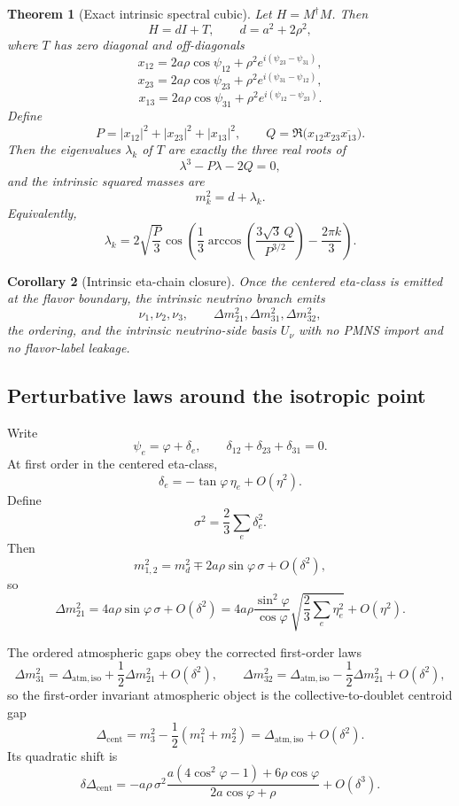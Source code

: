 \documentclass[11pt]{article}
\newtheorem{theorem}{Theorem}[section]
\newtheorem{corollary}[theorem]{Corollary}
\begin{document}
\begin{theorem}[Exact intrinsic spectral cubic]
Let \(H=M^\dagger M\). Then
\[
H=dI+T,
\qquad
d=a^2+2\rho^2,
\]
where \(T\) has zero diagonal and off-diagonals
\[
x_{12}=2a\rho\cos\psi_{12}+\rho^2e^{i(\psi_{23}-\psi_{31})},
\]
\[
x_{23}=2a\rho\cos\psi_{23}+\rho^2e^{i(\psi_{31}-\psi_{12})},
\]
\[
x_{13}=2a\rho\cos\psi_{31}+\rho^2e^{i(\psi_{12}-\psi_{23})}.
\]
Define
\[
P=|x_{12}|^2+|x_{23}|^2+|x_{13}|^2,
\qquad
Q=\Re\!\bigl(x_{12}x_{23}\overline{x_{13}}\bigr).
\]
Then the eigenvalues \(\lambda_k\) of \(T\) are exactly the three real roots of
\[
\lambda^3-P\lambda-2Q=0,
\]
and the intrinsic squared masses are
\[
m_k^2=d+\lambda_k.
\]
Equivalently,
\[
\lambda_k=
2\sqrt{\frac{P}{3}}
\cos\!\left(
\frac13\arccos\!\left(\frac{3\sqrt3\,Q}{P^{3/2}}\right)-\frac{2\pi k}{3}
\right).
\]
\end{theorem}

\begin{corollary}[Intrinsic eta-chain closure]
Once the centered eta-class is emitted at the flavor boundary, the intrinsic neutrino branch
emits
\[
\nu_1,\nu_2,\nu_3,\qquad
\Delta m_{21}^2,\Delta m_{31}^2,\Delta m_{32}^2,
\]
the ordering, and the intrinsic neutrino-side basis \(U_\nu\) with no PMNS import and no
flavor-label leakage.
\end{corollary}

\subsection{Perturbative laws around the isotropic point}

Write
\[
\psi_e=\varphi+\delta_e,
\qquad
\delta_{12}+\delta_{23}+\delta_{31}=0.
\]
At first order in the centered eta-class,
\[
\delta_e=-\tan\varphi\,\eta_e+O(\eta^2).
\]
Define
\[
\sigma^2=\frac23\sum_e \delta_e^2.
\]
Then
\[
m_{1,2}^2=m_d^2\mp 2a\rho\sin\varphi\,\sigma+O(\delta^2),
\]
so
\[
\Delta m_{21}^2 = 4a\rho\sin\varphi\,\sigma+O(\delta^2)
=4a\rho\frac{\sin^2\varphi}{\cos\varphi}
\sqrt{\frac23\sum_e\eta_e^2}+O(\eta^2).
\]

The ordered atmospheric gaps obey the corrected first-order laws
\[
\Delta m_{31}^2 = \Delta_{\mathrm{atm,iso}} + \frac12\Delta m_{21}^2 + O(\delta^2),
\qquad
\Delta m_{32}^2 = \Delta_{\mathrm{atm,iso}} - \frac12\Delta m_{21}^2 + O(\delta^2),
\]
so the first-order invariant atmospheric object is the collective-to-doublet centroid gap
\[
\Delta_{\mathrm{cent}}=
m_3^2-\frac12(m_1^2+m_2^2)
=
\Delta_{\mathrm{atm,iso}}+O(\delta^2).
\]
Its quadratic shift is
\[
\delta\Delta_{\mathrm{cent}}
=
-
a\rho\,\sigma^2
\frac{a(4\cos^2\varphi-1)+6\rho\cos\varphi}
 {2a\cos\varphi+\rho}
+O(\delta^3).
\]
\end{document}
